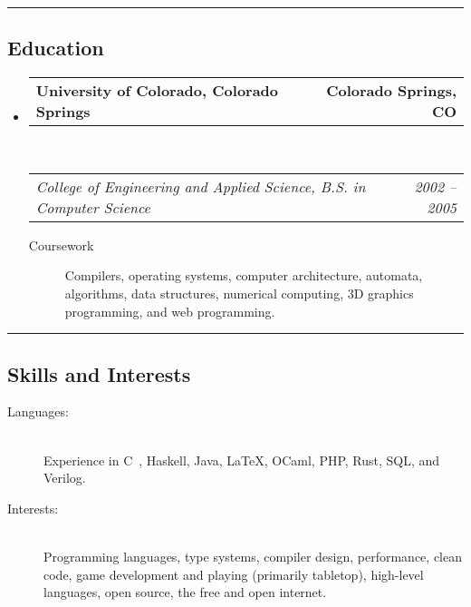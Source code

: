 \documentclass[10pt,letterpaper]{article}
\makeatletter
\newenvironment{indentsection}[1]%
{\begin{list}{}%
	{\setlength{\leftmargin}{#1}}%
	\item[]%
}
{\end{list}}
\newcommand{\headerrow}[2]
{\begin{tabular*}{\linewidth}{l@{\extracolsep{\fill}}r}
	#1 &
	#2 \\
\end{tabular*}}
\newcommand{\CPP}
{C\nolinebreak[4]\hspace{-.05em}\raisebox{.22ex}{\footnotesize\bf ++}}
\makeatother
\begin{document}
\hrule
\vspace{-0.4em}
\subsection*{Education}

\begin{itemize}
	\parskip=0.1em

	\item
	\headerrow
		{\textbf{University of Colorado, Colorado Springs}}
		{\textbf{Colorado Springs, CO}}
	\\
	\headerrow
		{\emph{College of Engineering and Applied Science, B.S. in Computer Science}}
		{\emph{2002 -- 2005}}
	\begin{description}
		\item[Coursework] Compilers, operating systems, computer architecture, automata, algorithms, data structures, numerical computing, 3D graphics programming, and web programming.
	\end{description}

\end{itemize}


\hrule
\vspace{-0.4em}
\subsection*{Skills and Interests}

\begin{indentsection}{\parindent}
\begin{description}
	\item[Languages:] \ \\
	Experience in \CPP \ , Haskell, Java, \LaTeX, OCaml, PHP, Rust, SQL, and Verilog. \\
	\item[Interests:] \ \\
	Programming languages, type systems, compiler design, performance, clean code, game development and playing (primarily tabletop), high-level languages, open source, the free and open internet.
\end{description}
\end{indentsection}
\end{document}
